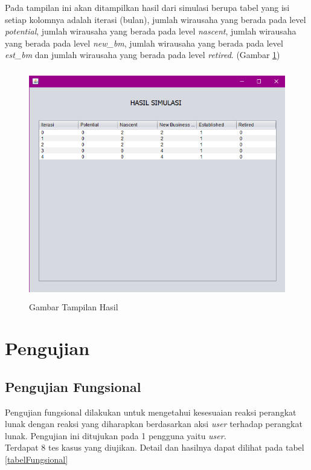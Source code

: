 \begin{enumerate}
	Pada tampilan ini akan ditampilkan hasil dari simulasi berupa tabel yang isi setiap kolomnya adalah iterasi (bulan), jumlah wirausaha yang berada pada level \textit{potential}, jumlah wirausaha yang berada pada level \textit{nascent}, jumlah wirausaha yang berada pada level \textit{new\_bm}, jumlah wirausaha yang berada pada level \textit{est\_bm} dan jumlah wirausaha yang berada pada level \textit{retired}. (Gambar \ref{fig:tampilanHasil})
	
	\begin{figure} [H]
	\centering  
	\includegraphics[width=12cm, height=10cm]{hasil2} 
		\caption[Gambar Tampilan Hasil]{Gambar Tampilan Hasil}
	\label{fig:tampilanHasil} 
\end{figure}

\end{enumerate}

\section{Pengujian}
\subsection{Pengujian Fungsional}
Pengujian fungsional dilakukan untuk mengetahui kesesuaian reaksi perangkat lunak dengan reaksi yang diharapkan berdasarkan aksi \textit{user} terhadap perangkat lunak. Pengujian ini ditujukan pada 1 pengguna yaitu \textit{user}.\\
Terdapat 8 tes kasus yang diujikan. Detail dan hasilnya dapat dilihat pada tabel \ref{tabelFungsional}

